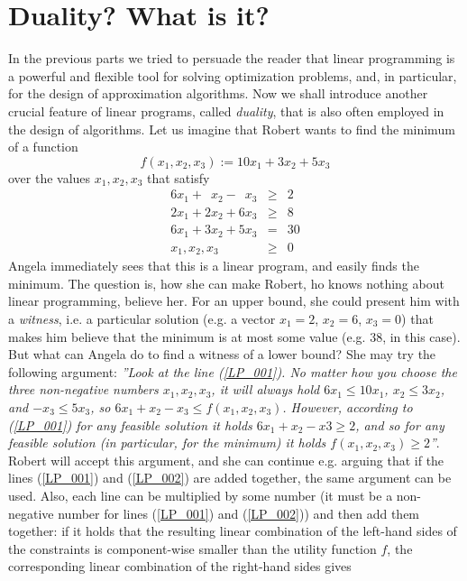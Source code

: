 \section{Duality? What is it?}

\noindent
In the previous parts we tried to persuade the reader that linear programming is a powerful and flexible
tool for solving optimization problems, and, in particular, for the design of approximation algorithms. 
Now we shall introduce another crucial feature of linear programs, called {\em duality},
that is also often employed in the design 
of algorithms. Let us imagine that Robert wants to find the minimum of a function
$$f(x_1,x_2,x_3):=10x_1+3x_2+5x_3$$ 
over the values $x_1, x_2, x_3$ that satisfy
\begin{eqnarray}
\label{LP_001}6x_1 + \phantom{2}x_2 - \phantom{3}x_3&\ge&2\\
\label{LP_002}2x_1 + 2x_2 + 6x_3&\ge&8\\
6x_1 + 3x_2 + 5x_3&=&30\nonumber\\
x_1,x_2,x_3&\ge&0\nonumber
\end{eqnarray}
Angela immediately sees that this is a linear program, and easily finds the minimum. The question is, 
how she can make Robert, ho knows nothing about linear programming, believe her. For an upper bound,
she could present him with a {\em witness}, i.e. a particular solution (e.g. a vector  $x_1=2$, $x_2=6$, $x_3=0$)
that makes him believe that the minimum is at most some value (e.g. 38, in this case). But what can Angela
do to find a witness of a lower bound? She may try the following argument: {\em ''Look at the line 
(\ref{LP_001}). No matter how you choose the three non-negative numbers $x_1, x_2, x_3$, it will always hold
$6x_1\le10x_1$, $x_2\le3x_2$, and $-x_3\le5x_3$, so $6x_1+x_2-x_3\le f(x_1,x_2,x_3)$. However, according
to  (\ref{LP_001}) for any feasible solution it holds  $6x_1+x_2-x3\ge2$, and so for any feasible solution
(in particular, for the minimum) it holds $f(x_1,x_2,x_3)\ge 2$''}. Robert will accept this argument, and
she can continue e.g. arguing that if the lines (\ref{LP_001}) and  (\ref{LP_002})
are added together, the same argument can be used. Also, each line can be multiplied by some number
(it must be a non-negative number for lines (\ref{LP_001}) and (\ref{LP_002})) and then add them together:
if it holds that the resulting linear combination of the left-hand sides of the constraints is component-wise
smaller than the utility function $f$, the corresponding linear combination of the right-hand sides gives
